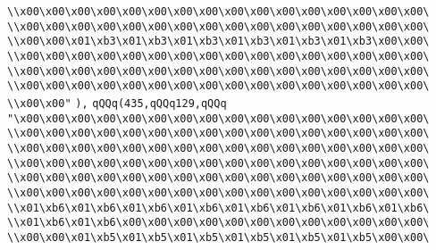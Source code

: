 \verb|\\x00\x00\x00\x00\x00\x00\x00\x00\x00\x00\x00\x00\x00\x00\x00\x00\|\newline
\verb|\\x00\x00\x00\x00\x00\x00\x00\x00\x00\x00\x00\x00\x00\x00\x00\x00\|\newline
\verb|\\x00\x00\x01\xb3\x01\xb3\x01\xb3\x01\xb3\x01\xb3\x01\xb3\x00\x00\|\newline
\verb|\\x00\x00\x00\x00\x00\x00\x00\x00\x00\x00\x00\x00\x00\x00\x00\x00\|\newline
\verb|\\x00\x00\x00\x00\x00\x00\x00\x00\x00\x00\x00\x00\x00\x00\x00\x00\|\newline
\verb|\\x00\x00\x00\x00\x00\x00\x00\x00\x00\x00\x00\x00\x00\x00\x00\x00\|\newline
\verb|\\x00\x00"|\newline
\verb|),|\newline
\verb|qQQq(435,qQQq129,qQQq|\newline
\verb|"\x00\x00\x00\x00\x00\x00\x00\x00\x00\x00\x00\x00\x00\x00\x00\x00\|\newline
\verb|\\x00\x00\x00\x00\x00\x00\x00\x00\x00\x00\x00\x00\x00\x00\x00\x00\|\newline
\verb|\\x00\x00\x00\x00\x00\x00\x00\x00\x00\x00\x00\x00\x00\x00\x00\x00\|\newline
\verb|\\x00\x00\x00\x00\x00\x00\x00\x00\x00\x00\x00\x00\x00\x00\x00\x00\|\newline
\verb|\\x00\x00\x00\x00\x00\x00\x00\x00\x00\x00\x00\x00\x00\x00\x00\x00\|\newline
\verb|\\x00\x00\x00\x00\x00\x00\x00\x00\x00\x00\x00\x00\x00\x00\x00\x00\|\newline
\verb|\\x01\xb6\x01\xb6\x01\xb6\x01\xb6\x01\xb6\x01\xb6\x01\xb6\x01\xb6\|\newline
\verb|\\x01\xb6\x01\xb6\x00\x00\x00\x00\x00\x00\x00\x00\x00\x00\x00\x00\|\newline
\verb|\\x00\x00\x01\xb5\x01\xb5\x01\xb5\x01\xb5\x01\xb5\x01\xb5\x00\x00\|\newline

